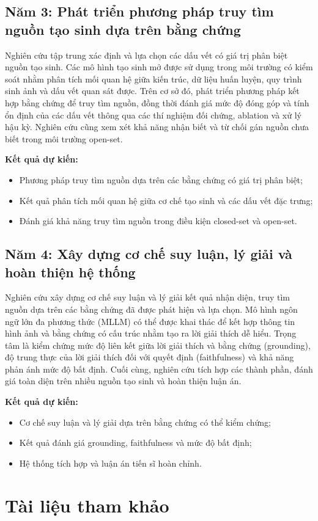 \documentclass[12pt]{report}
\begin{document}
\subsection{Năm 3: Phát triển phương pháp truy tìm nguồn tạo sinh dựa trên bằng chứng}

Nghiên cứu tập trung xác định và lựa chọn các dấu vết có giá trị phân biệt nguồn tạo sinh. Các mô hình tạo sinh mở được sử dụng trong môi trường có kiểm soát nhằm phân tích mối quan hệ giữa kiến trúc, dữ liệu huấn luyện, quy trình sinh ảnh và dấu vết quan sát được. Trên cơ sở đó, phát triển phương pháp kết hợp bằng chứng để truy tìm nguồn, đồng thời đánh giá mức độ đóng góp và tính ổn định của các dấu vết thông qua các thí nghiệm đối chứng, ablation và xử lý hậu kỳ. Nghiên cứu cũng xem xét khả năng nhận biết và từ chối gán nguồn chưa biết trong môi trường open-set.

\textbf{Kết quả dự kiến:}
\begin{itemize}
    \item Phương pháp truy tìm nguồn dựa trên các bằng chứng có giá trị phân biệt;
    \item Kết quả phân tích mối quan hệ giữa cơ chế tạo sinh và các dấu vết đặc trưng;
    \item Đánh giá khả năng truy tìm nguồn trong điều kiện closed-set và open-set.
\end{itemize}

\subsection{Năm 4: Xây dựng cơ chế suy luận, lý giải và hoàn thiện hệ thống}

Nghiên cứu xây dựng cơ chế suy luận và lý giải kết quả nhận diện, truy tìm nguồn dựa trên các bằng chứng đã được phát hiện và lựa chọn. Mô hình ngôn ngữ lớn đa phương thức (MLLM) có thể được khai thác để kết hợp thông tin hình ảnh và bằng chứng có cấu trúc nhằm tạo ra lời giải thích dễ hiểu. Trọng tâm là kiểm chứng mức độ liên kết giữa lời giải thích và bằng chứng (grounding), độ trung thực của lời giải thích đối với quyết định (faithfulness) và khả năng phản ánh mức độ bất định. Cuối cùng, nghiên cứu tích hợp các thành phần, đánh giá toàn diện trên nhiều nguồn tạo sinh và hoàn thiện luận án.

\textbf{Kết quả dự kiến:}
\begin{itemize}
    \item Cơ chế suy luận và lý giải dựa trên bằng chứng có thể kiểm chứng;
    \item Kết quả đánh giá grounding, faithfulness và mức độ bất định;
    \item Hệ thống tích hợp và luận án tiến sĩ hoàn chỉnh.
\end{itemize}
\clearpage
\section{Tài liệu tham khảo} 

\begingroup 
\setlength{\emergencystretch}{8em} 
\leavevmode\printbibliography[heading=none] 
\justifying 
\endgroup
\end{document}
